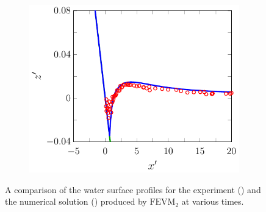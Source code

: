 \begin{figure}
\begin{subfigure}{0.5\textwidth}
		\includegraphics[width=\textwidth]{./chp6/figures/Experiment/Synolakis/H0p0185/FEVM/70s.pdf}
		\vspace{0.5cm}
	\end{subfigure}
	\caption{A comparison of the water surface profiles for the experiment () and the numerical solution ({\color{blue}\solidrule}) produced by $\text{FEVM}_2$ at various times.}
	\label{fig:SynolakisFEVMNoBreak}
\end{figure}

